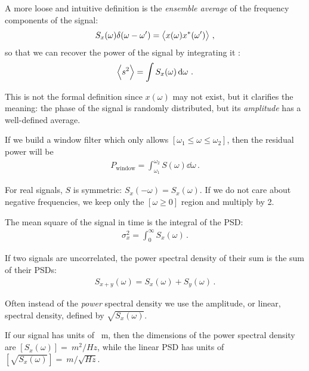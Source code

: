 \documentclass[main.tex]{subfiles}
\begin{document}
A more loose and intuitive definition is the \emph{ensemble average} of the frequency components of the signal: 
%
\begin{align}
S_x(\omega ) \delta (\omega - \omega') = \expval{x(\omega ) x^{*} (\omega')}
\,,
\end{align}
%
so that we can recover the power of the signal by integrating it \cite[eq.\ 7.12]{maggioreGravitationalWavesVolume2007}: 
%
\begin{align}
\expval{s^2} = \int S_x (\omega ) \dd{\omega }
\,.
\end{align}

This is not the formal definition since \(x(\omega )\) may not exist, but it clarifies the meaning: the phase of the signal is randomly distributed, but its \emph{amplitude} has a well-defined average. 


If we build a window filter which only allows \([\omega_1 \leq \omega \leq \omega_2 ]\), then the residual power will be 
%
\begin{align}
P _{\text{window}} = \int_{\omega_1 }^{\omega_2 } S(\omega ) \dd{\omega }
\,.
\end{align}

For real signals, \(S\) is symmetric: \(S_x (-\omega ) = S_x (\omega )\). 
If we do not care about negative frequencies, we keep only the \([\omega \geq 0 ]\) region and multiply by 2.

The mean square of the signal in time is the integral of the PSD: 
%
\begin{align}
\sigma^2_{x} = \int_{0}^{ \infty } S_x (\omega )
\,.
\end{align}

If two signals are uncorrelated, the power spectral density of their sum is the sum of their PSDs: 
%
\begin{align}
S_{x + y} (\omega ) = S_x (\omega ) + S_y (\omega )
\,.
\end{align}
%

Often instead of the \emph{power} spectral density we use the amplitude, or linear, spectral density, defined by \(\sqrt{S_x(\omega )}\). 

If our signal has units of \SI{}{m}, then the dimensions of the power spectral density are \([S_x(\omega )] = \SI{}{m^2/Hz}\), while the linear PSD has units of \([\sqrt{S_x(\omega )}] = \SI{}{m / \sqrt{Hz}}\).
\end{document}
